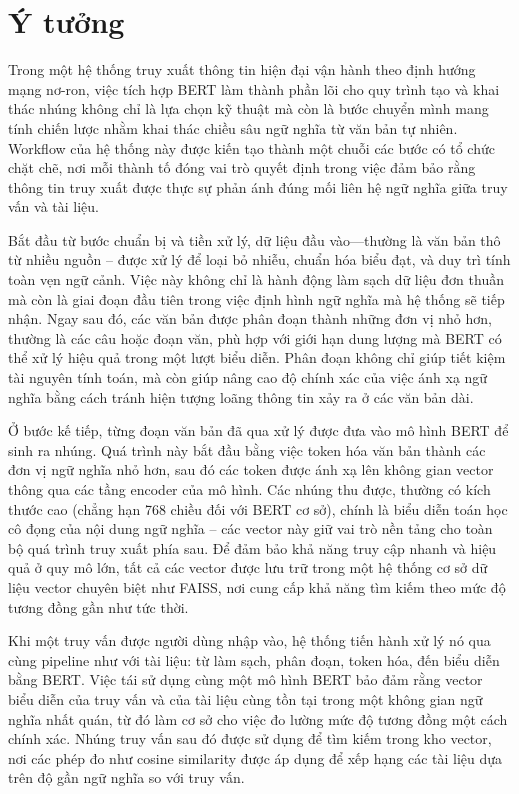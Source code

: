 \section{Ý tưởng}
Trong một hệ thống truy xuất thông tin hiện đại vận hành theo định hướng mạng nơ-ron, việc tích hợp BERT làm thành phần lõi cho quy trình tạo và khai thác nhúng không chỉ là lựa chọn kỹ thuật mà còn là bước chuyển mình mang tính chiến lược nhằm khai thác chiều sâu ngữ nghĩa từ văn bản tự nhiên. Workflow của hệ thống này được kiến tạo thành một chuỗi các bước có tổ chức chặt chẽ, nơi mỗi thành tố đóng vai trò quyết định trong việc đảm bảo rằng thông tin truy xuất được thực sự phản ánh đúng mối liên hệ ngữ nghĩa giữa truy vấn và tài liệu.

Bắt đầu từ bước chuẩn bị và tiền xử lý, dữ liệu đầu vào—thường là văn bản thô từ nhiều nguồn -- được xử lý để loại bỏ nhiễu, chuẩn hóa biểu đạt, và duy trì tính toàn vẹn ngữ cảnh. Việc này không chỉ là hành động làm sạch dữ liệu đơn thuần mà còn là giai đoạn đầu tiên trong việc định hình ngữ nghĩa mà hệ thống sẽ tiếp nhận. Ngay sau đó, các văn bản được phân đoạn thành những đơn vị nhỏ hơn, thường là các câu hoặc đoạn văn, phù hợp với giới hạn dung lượng mà BERT có thể xử lý hiệu quả trong một lượt biểu diễn. Phân đoạn không chỉ giúp tiết kiệm tài nguyên tính toán, mà còn giúp nâng cao độ chính xác của việc ánh xạ ngữ nghĩa bằng cách tránh hiện tượng loãng thông tin xảy ra ở các văn bản dài.

Ở bước kế tiếp, từng đoạn văn bản đã qua xử lý được đưa vào mô hình BERT để sinh ra nhúng. Quá trình này bắt đầu bằng việc token hóa văn bản thành các đơn vị ngữ nghĩa nhỏ hơn, sau đó các token được ánh xạ lên không gian vector thông qua các tầng encoder của mô hình. Các nhúng thu được, thường có kích thước cao (chẳng hạn 768 chiều đối với BERT cơ sở), chính là biểu diễn toán học cô đọng của nội dung ngữ nghĩa -- các vector này giữ vai trò nền tảng cho toàn bộ quá trình truy xuất phía sau. Để đảm bảo khả năng truy cập nhanh và hiệu quả ở quy mô lớn, tất cả các vector được lưu trữ trong một hệ thống cơ sở dữ liệu vector chuyên biệt như FAISS, nơi cung cấp khả năng tìm kiếm theo mức độ tương đồng gần như tức thời.

Khi một truy vấn được người dùng nhập vào, hệ thống tiến hành xử lý nó qua cùng pipeline như với tài liệu: từ làm sạch, phân đoạn, token hóa, đến biểu diễn bằng BERT. Việc tái sử dụng cùng một mô hình BERT bảo đảm rằng vector biểu diễn của truy vấn và của tài liệu cùng tồn tại trong một không gian ngữ nghĩa nhất quán, từ đó làm cơ sở cho việc đo lường mức độ tương đồng một cách chính xác. Nhúng truy vấn sau đó được sử dụng để tìm kiếm trong kho vector, nơi các phép đo như cosine similarity được áp dụng để xếp hạng các tài liệu dựa trên độ gần ngữ nghĩa so với truy vấn.

